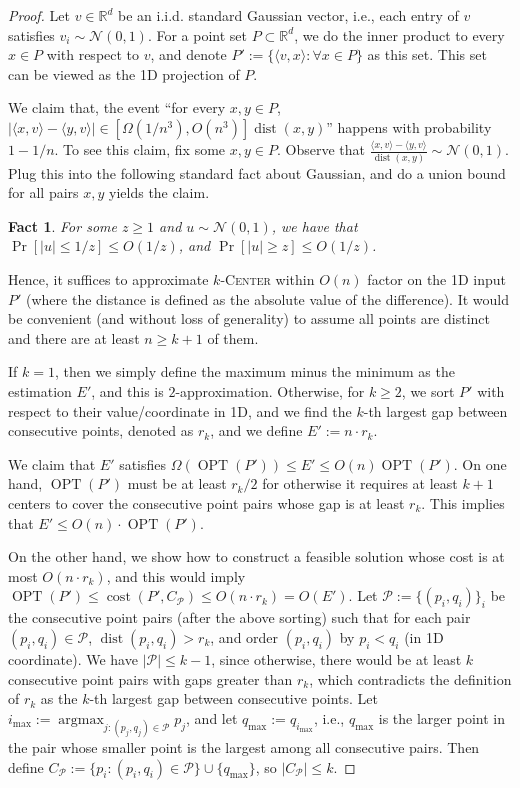 \documentclass[11pt,letterpaper]{article}
\theoremstyle{plain}
\newtheorem{fact}[theorem]{Fact}
\theoremstyle{definition}
\theoremstyle{remark}
\newcommand{\ProblemName}[1]{\textsc{#1}}
\newcommand{\kCenter}{$k$-\ProblemName{Center}\xspace}
\DeclareMathOperator{\cost}{cost}
\DeclareMathOperator{\OPT}{OPT}
\DeclareMathOperator{\dist}{dist}
\DeclareMathOperator*{\argmax}{argmax}
\begin{document}
\begin{proof}
    
Let $v\in \mathbb{R}^{d}$ be an i.i.d. standard Gaussian vector, i.e., each entry of $v$ satisfies $v_{i}\sim \mathcal{N}(0, 1)$. 
For a point set $P\subset \mathbb{R}^{d}$,
we do the inner product to every $x \in P$ with respect to $v$,
and denote $P':= \{\langle v, x\rangle: \forall x\in P\}$ as this set.
This set can be viewed as the 1D projection of $P$.

We claim that, the event ``for every $x, y \in P$, $|\langle x, v \rangle - \langle y, v\rangle| \in [\Omega(1 / n^3), O(n^3)] \dist(x, y)$'' happens with probability $1 - 1 / n$.
To see this claim, fix some $x, y \in P$. Observe that $\frac{\langle x, v \rangle - \langle y, v \rangle}{\dist(x, y)} \sim \mathcal{N}(0, 1)$.
Plug this into the following standard fact about Gaussian, and do a union bound for all pairs $x, y$ yields the claim.
\begin{fact}
    \label{fact:dimension reduction}
    For some $z \geq 1$ and $u\sim\mathcal{N}(0, 1)$, we have that 
    $\Pr[|u| \leq 1 / z] \leq O(1 / z)$, and
    $\Pr[|u| \geq z] \leq O(1 / z)$.
\end{fact}
Hence, it suffices to approximate \kCenter within $O(n)$ factor on the 1D input $P'$ (where the distance is defined as the absolute value of the difference).
It would be convenient (and without loss of generality) to assume all points are distinct and there are at least $n \geq k + 1$ of them.

If $k = 1$, then we simply define the maximum minus the minimum as the estimation $E'$, and this is $2$-approximation.
Otherwise, for $k \geq 2$, we sort $P'$ with respect to their value/coordinate in 1D,
and we find the $k$-th largest gap between consecutive points, denoted as $r_k$, and we define $E' := n\cdot r_k$.

We claim that $E'$ satisfies $\Omega(\OPT(P')) \leq E' \leq O(n)\OPT(P')$. 
On one hand, $\OPT(P')$ must be at least $r_k/2$
for otherwise it requires at least $k + 1$ centers to cover the consecutive point pairs whose gap is at least $r_k$. 
This implies that $E'\leq O(n)\cdot \OPT(P')$. 

On the other hand, we show how to  construct a feasible solution whose cost is at most $O(n\cdot r_k)$,
and this would imply $\OPT(P')\leq \cost(P', C_{\mathcal{P}}) \leq O(n\cdot r_k) = O(E')$. 
Let $\mathcal{P} := \{ (p_i, q_i) \}_{i}$ be the consecutive point pairs (after the above sorting)
such that for each pair $(p_{i}, q_{i})\in \mathcal{P}$, $\dist(p_{i}, q_{i})>r_{k}$, and order $(p_i, q_i)$ by $p_i < q_i$ (in 1D coordinate). 
We have $|\mathcal{P}|\leq k-1$,
since otherwise,  there would be at least $k$ consecutive point pairs with gaps greater than $r_{k}$, which contradicts the definition of $r_{k}$ as the $k$-th largest gap between consecutive points. 
Let $i_{\max} := \argmax_{j : (p_j, q_j) \in \mathcal{P}} p_j$,
and let $q_{\max} := q_{i_{\max}}$, i.e., $q_{\max}$ is the larger point in the pair whose smaller point is the largest among all consecutive pairs.
Then define $C_{\mathcal{P}} := \{ p_i : (p_i, q_i) \in \mathcal{P} \}\cup \{q_{\max}\}$, so $|C_{\mathcal{P}}|\leq k$. 


\end{proof}
\end{document}
